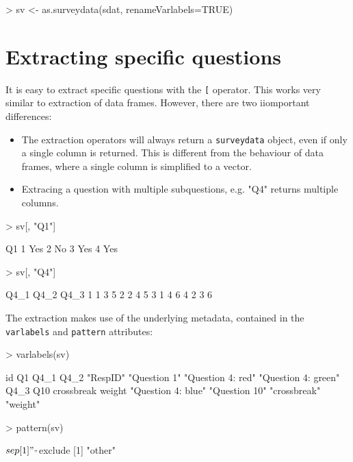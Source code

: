 \documentclass[a4paper]{article}
\newcommand{\sdata}{{\tt surveydata}}
\begin{document}
\begin{Schunk}
\begin{Sinput}
> sv <- as.surveydata(sdat, renameVarlabels=TRUE)
\end{Sinput}
\end{Schunk}


\section{Extracting specific questions}

It is easy to extract specific questions with the \texttt{[} operator. This works very similar to extraction of data frames. However, there are two iiomportant differences:

\begin{itemize}
\item{The extraction operators will always return a \sdata{} object, even if only a single column is returned. This is different from the behaviour of data frames, where a single column is simplified to a vector.}
\item{Extracing a question with multiple subquestions, e.g. "Q4" returns multiple columns.}
\end{itemize}


\begin{Schunk}
\begin{Sinput}
> sv[, "Q1"]
\end{Sinput}
\begin{Soutput}
   Q1
1 Yes
2  No
3 Yes
4 Yes
\end{Soutput}
\begin{Sinput}
> sv[, "Q4"]
\end{Sinput}
\begin{Soutput}
  Q4_1 Q4_2 Q4_3
1    1    3    5
2    2    4    5
3    1    4    6
4    2    3    6
\end{Soutput}
\end{Schunk}

The extraction makes use of the underlying metadata, contained in the \texttt{varlabels} and \texttt{pattern} attributes:

\begin{Schunk}
\begin{Sinput}
> varlabels(sv)
\end{Sinput}
\begin{Soutput}
                 id                  Q1                Q4_1                Q4_2 
           "RespID"        "Question 1"   "Question 4: red" "Question 4: green" 
               Q4_3                 Q10          crossbreak              weight 
 "Question 4: blue"       "Question 10"        "crossbreak"            "weight" 
\end{Soutput}
\begin{Sinput}
> pattern(sv)
\end{Sinput}
\begin{Soutput}
$sep
[1] "_"

$exclude
[1] "other"
\end{Soutput}
\end{Schunk}
\end{document}
